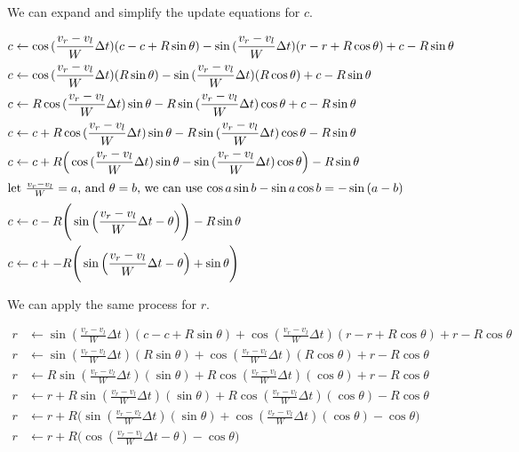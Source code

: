 \documentclass{article}
\begin{document}
We can expand and simplify the update equations for $c$.

\begin{align}
  c &\leftarrow \cos{(\frac{v_r-v_l}{W}\Delta t)}(c-c+R\sin{\theta})-\sin{(\frac{v_r-v_l}{W}\Delta t)}(r-r+R\cos{\theta}) + c-R\sin{\theta} \\
  c &\leftarrow \cos{(\frac{v_r-v_l}{W}\Delta t)}(R\sin{\theta})-\sin{(\frac{v_r-v_l}{W}\Delta t)}(R\cos{\theta}) + c-R\sin{\theta} \\
  c &\leftarrow R\cos{(\frac{v_r-v_l}{W}\Delta t)}\sin{\theta}-R\sin{(\frac{v_r-v_l}{W}\Delta t)}\cos{\theta} + c-R\sin{\theta} \\
  c &\leftarrow c+R\cos{(\frac{v_r-v_l}{W}\Delta t)}\sin{\theta}-R\sin{(\frac{v_r-v_l}{W}\Delta t)}\cos{\theta}-R\sin{\theta} \\
  c &\leftarrow c+R\Big(\cos{(\frac{v_r-v_l}{W}\Delta t)}\sin{\theta}-\sin{(\frac{v_r-v_l}{W}\Delta t)}\cos{\theta}\Big)-R\sin{\theta} \\
  \shortintertext{let $\frac{v_r-v_l}{W}=a$, and $\theta=b$, we can use $\cos{a}\sin{b}-\sin{a}\cos{b}=-\sin{(a-b)}$}
  c &\leftarrow c-R\Bigg(\sin{\Big(\frac{v_r-v_l}{W}\Delta t-\theta}\Big)\Bigg)-R\sin{\theta} \\
  c &\leftarrow c+-R\Bigg(\sin{\Big(\frac{v_r-v_l}{W}\Delta t-\theta}\Big)+\sin{\theta}\Bigg)
\end{align}

We can apply the same process for $r$.

\begin{align}
  r &\leftarrow \sin{(\frac{v_r-v_l}{W}\Delta t)}(c-c+R\sin{\theta})+\cos{(\frac{v_r-v_l}{W}\Delta t)}(r-r+R\cos{\theta}) + r-R\cos{\theta} \\
  r &\leftarrow \sin{(\frac{v_r-v_l}{W}\Delta t)}(R\sin{\theta})+\cos{(\frac{v_r-v_l}{W}\Delta t)}(R\cos{\theta}) + r-R\cos{\theta} \\
  r &\leftarrow R\sin{(\frac{v_r-v_l}{W}\Delta t)}(\sin{\theta})+R\cos{(\frac{v_r-v_l}{W}\Delta t)}(\cos{\theta}) + r-R\cos{\theta} \\
  r &\leftarrow r + R\sin{(\frac{v_r-v_l}{W}\Delta t)}(\sin{\theta})+R\cos{(\frac{v_r-v_l}{W}\Delta t)}(\cos{\theta}) - R\cos{\theta} \\
  r &\leftarrow r + R\Bigg(\sin{(\frac{v_r-v_l}{W}\Delta t)}(\sin{\theta})+\cos{(\frac{v_r-v_l}{W}\Delta t)}(\cos{\theta}) - \cos{\theta}\Bigg) \\
  r &\leftarrow r + R\Bigg(\cos{(\frac{v_r-v_l}{W}\Delta t - \theta)} - \cos{\theta}\Bigg)
\end{align}
\end{document}
